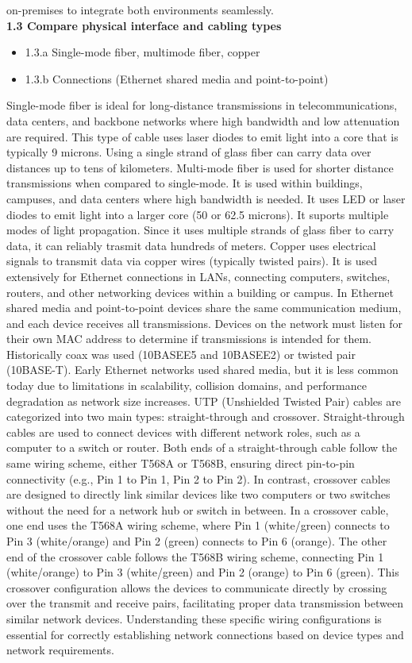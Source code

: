 \documentclass{article}
\begin{document}
on-premises to integrate both environments seamlessly.\\
  
\textbf{1.3 Compare physical interface and cabling types}
\begin{itemize}
\item 1.3.a Single-mode fiber, multimode fiber, copper
\item 1.3.b Connections (Ethernet shared media and point-to-point)
\end{itemize}
  
	Single-mode fiber is ideal for long-distance transmissions in telecommunications, data centers, and backbone networks where high bandwidth and low attenuation are required. This type of cable uses laser diodes to emit light into a core that is typically 9 microns. Using a single strand of glass fiber can carry data over distances up to tens of kilometers. Multi-mode fiber is used for shorter distance transmissions when compared to single-mode. It is used within buildings, campuses, and data centers where high bandwidth is needed. It uses LED or laser diodes to emit light into a larger core (50 or 62.5 microns). It suports multiple modes of light propagation. Since it uses multiple strands of glass fiber to carry data, it can reliably trasmit data hundreds of meters. Copper uses electrical signals to transmit data via copper wires (typically twisted pairs). It is used extensively for Ethernet connections in LANs, connecting computers, switches, routers, and other networking devices within a building or campus. In Ethernet shared media and point-to-point devices share the same communication medium, and each device receives all transmissions. Devices on the network must listen for their own MAC address to determine if transmissions is intended for them. Historically coax was used (10BASEE5 and 10BASEE2) or twisted pair (10BASE-T). Early Ethernet networks used shared media, but it is less common today due to limitations in scalability, collision domains, and performance degradation as network size increases. UTP (Unshielded Twisted Pair) cables are categorized into two main types: straight-through and crossover. Straight-through cables are used to connect devices with different network roles, such as a computer to a switch or router. Both ends of a straight-through cable follow the same wiring scheme, either T568A or T568B, ensuring direct pin-to-pin connectivity (e.g., Pin 1 to Pin 1, Pin 2 to Pin 2). In contrast, crossover cables are designed to directly link similar devices like two computers or two switches without the need for a network hub or switch in between. In a crossover cable, one end uses the T568A wiring scheme, where Pin 1 (white/green) connects to Pin 3 (white/orange) and Pin 2 (green) connects to Pin 6 (orange). The other end of the crossover cable follows the T568B wiring scheme, connecting Pin 1 (white/orange) to Pin 3 (white/green) and Pin 2 (orange) to Pin 6 (green). This crossover configuration allows the devices to communicate directly by crossing over the transmit and receive pairs, facilitating proper data transmission between similar network devices. Understanding these specific wiring configurations is essential for correctly establishing network connections based on device types and network requirements.
	
\end{document}
